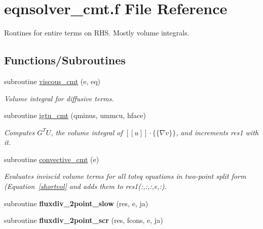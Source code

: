 \hypertarget{eqnsolver__cmt_8f}{\section{eqnsolver\-\_\-cmt.\-f File Reference}
\label{eqnsolver__cmt_8f}
}


Routines for entire terms on R\-H\-S. Mostly volume integrals.  


\subsection*{Functions/\-Subroutines}
\begin{DoxyCompactItemize}
\item 
subroutine \hyperlink{group__diffhvol_ga6d611a250fb98acf77e8a3880c0e608d}{viscous\-\_\-cmt} (e, eq)
\begin{DoxyCompactList}\small\item\em Volume integral for diffusive terms. \end{DoxyCompactList}\item 
subroutine \hyperlink{group__vsurf_ga98d826061a0ffb225d37cb73b86a9475}{igtu\-\_\-cmt} (qminus, ummcu, hface)
\begin{DoxyCompactList}\small\item\em Computes $G^T U$, the volume integral of $[[u]]\cdot\{\{\nabla v\}\}$, and increments res1 with it. \end{DoxyCompactList}\item 
subroutine \hyperlink{group__convhvol_ga77e7d7a46950fcbbf072e8e900cee272}{convective\-\_\-cmt} (e)
\begin{DoxyCompactList}\small\item\em Evaluates inviscid volume terms for all toteq equations in two-\/point split form (Equation~\ref{shortvol} and adds them to res1(\-:,\-:,\-:,e,\-:). \end{DoxyCompactList}\item 
\hypertarget{eqnsolver__cmt_8f_a2135bd9a2e75728f817f2b8af7124073}{subroutine {\bfseries fluxdiv\-\_\-2point\-\_\-slow} (res, e, ja)}\label{eqnsolver__cmt_8f_a2135bd9a2e75728f817f2b8af7124073}

\item 
\hypertarget{eqnsolver__cmt_8f_aff3fe4ef3d2532483001e44143232058}{subroutine {\bfseries fluxdiv\-\_\-2point\-\_\-scr} (res, fcons, e, ja)}\label{eqnsolver__cmt_8f_aff3fe4ef3d2532483001e44143232058}


\end{DoxyCompactItemize}

